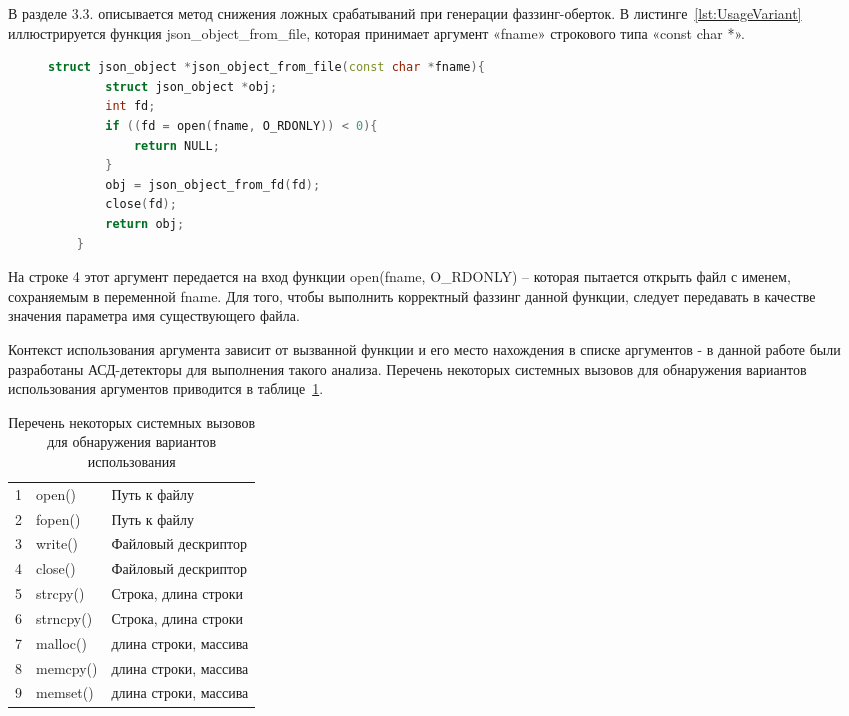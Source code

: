 В разделе 3.3. описывается метод снижения ложных срабатываний при генерации фаззинг-оберток. В листинге~\cref{lst:UsageVariant} иллюстрируется функция json\_object\_from\_file, которая принимает аргумент «fname» строкового типа «const char *». 

\begin{figure}[thp]
\begin{lstlisting}[language=C++,frame=single,caption={Пример варианта использования аргументов функции},label=lst:UsageVariant]
    struct json_object *json_object_from_file(const char *fname){
        struct json_object *obj;
        int fd;
        if ((fd = open(fname, O_RDONLY)) < 0){
            return NULL;
        }
        obj = json_object_from_fd(fd);
        close(fd);
        return obj;
    }
    \end{lstlisting}
\end{figure}

На строке 4 этот аргумент передается на вход функции open(fname, O\_RDONLY) – которая пытается открыть файл с именем, сохраняемым в переменной fname. Для того, чтобы выполнить корректный фаззинг данной функции, следует передавать в качестве значения параметра имя существующего файла. 



Контекст использования аргумента зависит от вызванной функции и его место нахождения в списке аргументов - в данной работе были разработаны АСД-детекторы для выполнения такого анализа. Перечень некоторых системных вызовов для обнаружения вариантов использования аргументов приводится в таблице~\cref{tab:ArgAnalysis}.

\begin{table}
    \centering
    \captionsetup{justification=centering}
    \caption{Перечень некоторых системных вызовов для обнаружения вариантов использования}\label{tab:ArgAnalysis}
    \begin{tabular}{|c|l|l|}
        \hline
        {1} & {open()} & Путь к файлу \\
        {2} & {fopen()} & Путь к файлу \\
        {3} & {write()} & Файловый дескриптор \\
        {4} & {close()} & Файловый дескриптор \\
        {5} & {strcpy()} & Строка, длина строки \\
        {6} & {strncpy()} & Строка, длина строки \\
        {7} & {malloc()} & длина строки, массива \\
        {8} & {memcpy()} & длина строки, массива \\
        {9} & {memset()} & длина строки, массива \\
        \hline
    \end{tabular}
\end{table}

